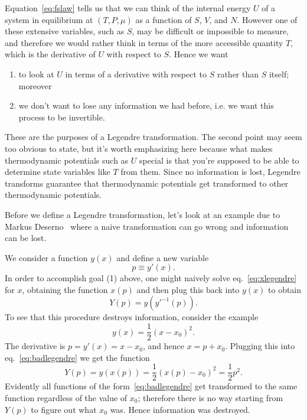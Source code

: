 Equation~\eqref{eq:fslaw} tells us that we can think of the internal energy
$U$ of a system in equilibrium at $(T,P,\mu)$ as a function of $S$, $V$, and
$N$. However one of these extensive variables, such as $S$, may be
difficult or impossible to measure, and therefore we would rather
think in terms of the more accessible quantity $T$, which 
is the derivative of $U$ with respect to $S$. 
Hence we want 
\begin{enumerate}
\item to look at $U$ in terms of a derivative with respect to $S$ rather 
      than $S$ itself; moreover 
\item we don't want to lose any information we had before, i.e. we want this
      process to be invertible. 
\end{enumerate}
These are the purposes of a Legendre transformation. The second point 
may seem too obvious to state, but it's worth emphasizing here because 
what makes thermodynamic potentials such as $U$ special is that you're 
supposed to be able to determine state variables like $T$ from them. 
Since no information is lost, Legendre transforms guarantee that 
thermodynamic potentials get transformed to other thermodynamic potentials.

Before we define a Legendre transformation, let's look at an example
due to Markus Deserno~\cite{deserno} where a naive transformation can go
wrong and information can be lost. 
\begin{example*}{}
We consider a function $y(x)$ and define a new variable
\begin{equation}\label{eq:xlegendre}
  p\equiv y'(x).
\end{equation}
In order to accomplish goal (1) above, one might naively solve
eq.~\eqref{eq:xlegendre} for $x$, obtaining the function $x(p)$
and then plug this back into $y(x)$ to obtain
\begin{equation}
  Y(p)=y\left(y'^{-1}(p)\right).
\end{equation}
To see that this procedure destroys information, consider the example
\begin{equation}\label{eq:badlegendre}
  y(x)=\frac{1}{2}(x-x_0)^2.
\end{equation}
The derivative is $p=y'(x)=x-x_0$, and hence $x=p+x_0$. Plugging this
into eq.~\eqref{eq:badlegendre} we get the function
\begin{equation}
  Y(p)=y(x(p))=\frac{1}{2}\left(x(p)-x_0\right)^2=\frac{1}{2}p^2.
\end{equation}
Evidently all functions of the form~\eqref{eq:badlegendre} get transformed
to the same function regardless of the value of $x_0$; therefore there is
no way starting from $Y(p)$ to figure out what $x_0$ was. Hence
information was destroyed.
\end{example*}


